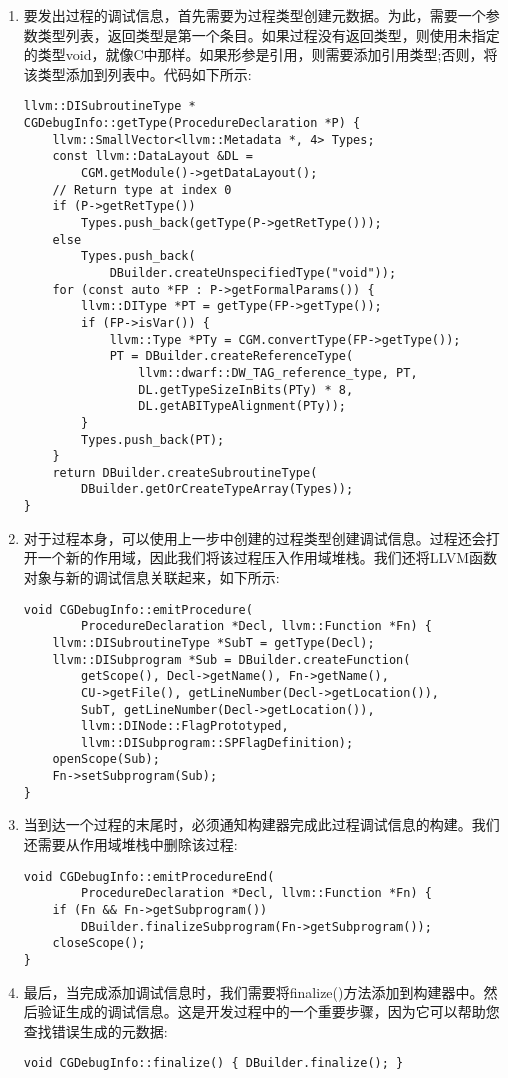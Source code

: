 \begin{enumerate}
\item 要发出过程的调试信息，首先需要为过程类型创建元数据。为此，需要一个参数类型列表，返回类型是第一个条目。如果过程没有返回类型，则使用未指定的类型void，就像C中那样。如果形参是引用，则需要添加引用类型;否则，将该类型添加到列表中。代码如下所示:
\begin{lstlisting}[caption={}]
llvm::DISubroutineType *
CGDebugInfo::getType(ProcedureDeclaration *P) {
	llvm::SmallVector<llvm::Metadata *, 4> Types;
	const llvm::DataLayout &DL =
		CGM.getModule()->getDataLayout();
	// Return type at index 0
	if (P->getRetType())
		Types.push_back(getType(P->getRetType()));
	else
		Types.push_back(
			DBuilder.createUnspecifiedType("void"));
	for (const auto *FP : P->getFormalParams()) {
		llvm::DIType *PT = getType(FP->getType());
		if (FP->isVar()) {
			llvm::Type *PTy = CGM.convertType(FP->getType());
			PT = DBuilder.createReferenceType(
				llvm::dwarf::DW_TAG_reference_type, PT,
				DL.getTypeSizeInBits(PTy) * 8,
				DL.getABITypeAlignment(PTy));
		}
		Types.push_back(PT);
	}
	return DBuilder.createSubroutineType(
		DBuilder.getOrCreateTypeArray(Types));
}
\end{lstlisting}

\item 对于过程本身，可以使用上一步中创建的过程类型创建调试信息。过程还会打开一个新的作用域，因此我们将该过程压入作用域堆栈。我们还将LLVM函数对象与新的调试信息关联起来，如下所示:
\begin{lstlisting}[caption={}]
void CGDebugInfo::emitProcedure(
		ProcedureDeclaration *Decl, llvm::Function *Fn) {
	llvm::DISubroutineType *SubT = getType(Decl);
	llvm::DISubprogram *Sub = DBuilder.createFunction(
		getScope(), Decl->getName(), Fn->getName(),
		CU->getFile(), getLineNumber(Decl->getLocation()),
		SubT, getLineNumber(Decl->getLocation()),
		llvm::DINode::FlagPrototyped,
		llvm::DISubprogram::SPFlagDefinition);
	openScope(Sub);
	Fn->setSubprogram(Sub);
}
\end{lstlisting}

\item 当到达一个过程的末尾时，必须通知构建器完成此过程调试信息的构建。我们还需要从作用域堆栈中删除该过程:
\begin{lstlisting}[caption={}]
void CGDebugInfo::emitProcedureEnd(
		ProcedureDeclaration *Decl, llvm::Function *Fn) {
	if (Fn && Fn->getSubprogram())
		DBuilder.finalizeSubprogram(Fn->getSubprogram());
	closeScope();
}
\end{lstlisting}

\item 最后，当完成添加调试信息时，我们需要将finalize()方法添加到构建器中。然后验证生成的调试信息。这是开发过程中的一个重要步骤，因为它可以帮助您查找错误生成的元数据:
\begin{lstlisting}[caption={}]
void CGDebugInfo::finalize() { DBuilder.finalize(); }
\end{lstlisting}

\end{enumerate}

